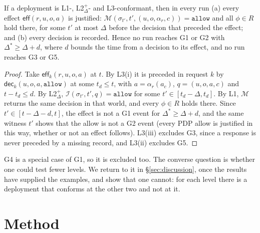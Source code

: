 \documentclass[sigconf,review,anonymous]{acmart}
\newcommand{\allowv}{\mathtt{allow}}
\newcommand{\ev}[1]{\mathsf{#1}}
\begin{document}
\begin{theorem}[Composition]\label{thm:compose}
If a deployment is L1-, L2$^+_\Delta$- and L3-conformant, then in every run (a) every effect $\ev{eff}(r,u,o,a)$ is
justified: $\mathcal{M}(\sigma_{t'},t',(u,o,\alpha_r,c))=\allowv$ and all $\phi\in R$ hold there, for some $t'$
at most $\Delta$ before the decision that preceded the effect; and (b) every decision is recorded. Hence no run
reaches G1 or G2 with $\Delta^\ast\ge\Delta+\mathit{d}$, where $\mathit{d}$ bounds the time from a decision to its
effect, and no run reaches G3 or G5.
\end{theorem}
\begin{proof}
Take $\ev{eff}_k(r,u,o,a)$ at $t$. By L3(i) it is preceded in request $k$ by $\ev{dec}_k(u,o,a,\allowv)$ at some
$t_d\le t$, with $a=\alpha_r(a_c)$, $q=(u,o,a,c)$ and $t-t_d\le\mathit{d}$. By L2$^+_\Delta$,
$\mathcal{I}(\sigma_{t'},t',q)=\allowv$ for some $t'\in[t_d-\Delta,t_d]$. By L1, $\mathcal{M}$ returns the same
decision in that world, and every $\phi\in R$ holds there. Since $t'\in[t-\Delta-\mathit{d},t]$, the effect is not a
G1 event for $\Delta^\ast\ge\Delta+\mathit{d}$, and the same witness $t'$ shows that the allow is not a G2 event
(every PDP allow is justified in this way, whether or not an effect follows). L3(iii) excludes G3, since a
response is never preceded by a missing record, and L3(ii) excludes G5.
\end{proof}

G4 is a special case of G1, so it is excluded too. The converse question is whether one could test fewer
levels. We return to it in \S\ref{sec:discussion}, once the results have supplied the examples, and show that one
cannot: for each level there is a deployment that conforms at the other two and not at it.


\section{Method}
\label{sec:method}
\end{document}
